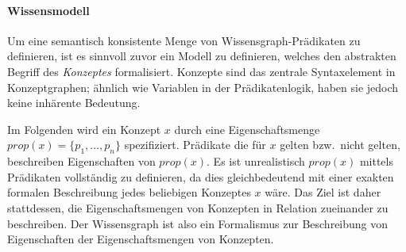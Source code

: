\paragraph{Wissensmodell}
Um eine semantisch konsistente Menge von Wissensgraph-Prädikaten zu definieren, ist es sinnvoll zuvor ein Modell zu definieren, welches den abstrakten Begriff des \textit{Konzeptes} formalisiert.
Konzepte sind das zentrale Syntaxelement in Konzeptgraphen;
ähnlich wie Variablen in der Prädikatenlogik, haben sie jedoch keine inhärente Bedeutung.

Im Folgenden wird ein Konzept $x$ durch eine Eigenschaftsmenge $prop(x) = \{ p_1, \dots, p_n \}$ spezifiziert.
Prädikate die für $x$ gelten bzw.\ nicht gelten, beschreiben Eigenschaften von $prop(x)$.
Es ist unrealistisch $prop(x)$ mittels Prädikaten vollständig zu definieren, da dies gleichbedeutend mit einer exakten formalen Beschreibung jedes beliebigen Konzeptes $x$ wäre.
Das Ziel ist daher stattdessen, die Eigenschaftsmengen von Konzepten in Relation zueinander zu beschreiben.
Der Wissensgraph ist also ein Formalismus zur Beschreibung von Eigenschaften der Eigenschaftsmengen von Konzepten.

